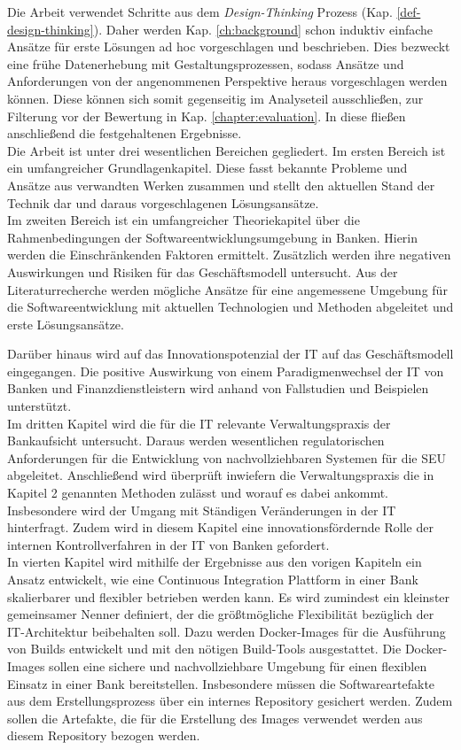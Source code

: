 Die Arbeit verwendet Schritte aus dem \emph{Design-Thinking} Prozess (Kap. \ref{def-design-thinking}). Daher werden Kap. \ref{ch:background} schon induktiv einfache Ansätze für erste Lösungen ad hoc vorgeschlagen und beschrieben. Dies bezweckt eine frühe Datenerhebung mit Gestaltungsprozessen, sodass Ansätze und Anforderungen von der angenommenen Perspektive heraus vorgeschlagen werden können. Diese können sich somit gegenseitig im Analyseteil ausschließen, zur Filterung vor der Bewertung in Kap. \ref{chapter:evaluation}. In diese fließen anschließend die festgehaltenen Ergebnisse.
\medskip
\\
Die Arbeit ist unter drei wesentlichen Bereichen gegliedert. 
Im ersten Bereich ist ein umfangreicher Grundlagenkapitel. Diese fasst bekannte Probleme und Ansätze aus verwandten Werken zusammen und stellt den aktuellen Stand der Technik dar und daraus vorgeschlagenen Lösungsansätze. 
\medskip
\\
Im zweiten Bereich ist ein umfangreicher Theoriekapitel über die Rahmenbedingungen der Softwareentwicklungsumgebung in Banken. Hierin werden die Einschränkenden Faktoren ermittelt. Zusätzlich werden ihre negativen Auswirkungen und Risiken für das Geschäftsmodell untersucht. Aus der Literaturrecherche werden mögliche Ansätze für eine angemessene Umgebung für die Softwareentwicklung mit aktuellen Technologien und Methoden abgeleitet und erste Lösungsansätze. 

Darüber hinaus wird auf das Innovationspotenzial der IT auf das Geschäftsmodell eingegangen. Die positive Auswirkung von einem Paradigmenwechsel der IT von Banken und Finanzdienstleistern wird anhand von Fallstudien und Beispielen unterstützt.
\medskip
\\
Im dritten Kapitel wird die für die IT relevante Verwaltungspraxis der Bankaufsicht untersucht. Daraus werden wesentlichen regulatorischen Anforderungen für die Entwicklung von nachvollziehbaren Systemen für die \ac{SEU} abgeleitet. Anschließend wird überprüft inwiefern die Verwaltungspraxis die in Kapitel 2 genannten Methoden zulässt und worauf es dabei ankommt. Insbesondere wird der Umgang mit Ständigen Veränderungen in der IT hinterfragt. Zudem wird in diesem Kapitel eine innovationsfördernde Rolle der internen Kontrollverfahren in der IT von Banken gefordert.
\medskip
\\
In vierten Kapitel wird mithilfe der Ergebnisse aus den vorigen Kapiteln ein Ansatz entwickelt, wie eine Continuous Integration Plattform in einer Bank skalierbarer und flexibler betrieben werden kann. Es wird zumindest ein kleinster gemeinsamer Nenner definiert, der die größtmögliche Flexibilität bezüglich der IT-Architektur beibehalten soll. Dazu werden Docker-Images für die Ausführung von Builds entwickelt und mit den nötigen Build-Tools ausgestattet. Die Docker-Images sollen eine sichere und nachvollziehbare Umgebung für einen flexiblen Einsatz in einer Bank bereitstellen. Insbesondere müssen die Softwareartefakte aus dem Erstellungsprozess über ein internes Repository gesichert werden. Zudem sollen die Artefakte, die für die Erstellung des Images verwendet werden aus diesem Repository bezogen werden. 